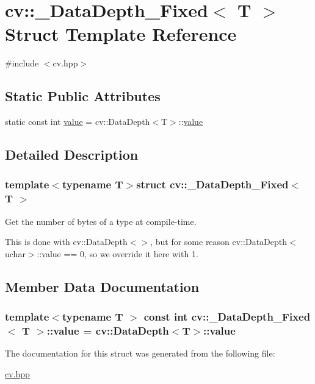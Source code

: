 \hypertarget{structcv_1_1___data_depth___fixed}{\section{cv\-:\-:\-\_\-\-Data\-Depth\-\_\-\-Fixed$<$ T $>$ Struct Template Reference}
\label{structcv_1_1___data_depth___fixed}
}


{\ttfamily \#include $<$cv.\-hpp$>$}

\subsection*{Static Public Attributes}
\begin{DoxyCompactItemize}
\item 
static const int \hyperlink{structcv_1_1___data_depth___fixed_af89695d05a7e67be77f18b4b76870ab0}{value} = cv\-::\-Data\-Depth$<$T$>$\-::\hyperlink{structcv_1_1___data_depth___fixed_af89695d05a7e67be77f18b4b76870ab0}{value}
\end{DoxyCompactItemize}


\subsection{Detailed Description}
\subsubsection*{template$<$typename T$>$struct cv\-::\-\_\-\-Data\-Depth\-\_\-\-Fixed$<$ T $>$}

Get the number of bytes of a type at compile-\/time.

This is done with {\ttfamily cv\-::\-Data\-Depth$<$$>$}, but for some reason {\ttfamily cv\-::\-Data\-Depth$<$uchar$>$\-::value} == 0, so we override it here with 1. 

\subsection{Member Data Documentation}
\hypertarget{structcv_1_1___data_depth___fixed_af89695d05a7e67be77f18b4b76870ab0}{
\subsubsection[{value}]{\setlength{\rightskip}{0pt plus 5cm}template$<$typename T $>$ const int {\bf cv\-::\-\_\-\-Data\-Depth\-\_\-\-Fixed}$<$ T $>$\-::{\bf value} = cv\-::\-Data\-Depth$<$T$>$\-::{\bf value}}}\label{structcv_1_1___data_depth___fixed_af89695d05a7e67be77f18b4b76870ab0}


The documentation for this struct was generated from the following file\-:\begin{DoxyCompactItemize}
\item 
\hyperlink{cv_8hpp}{cv.\-hpp}\end{DoxyCompactItemize}
